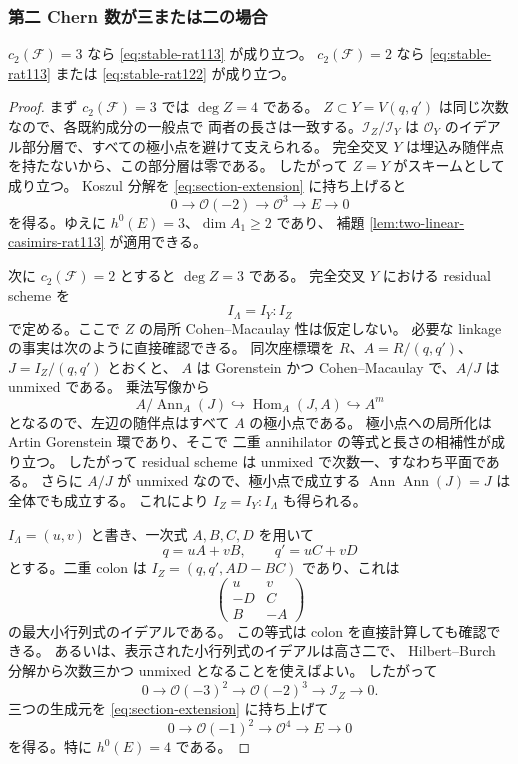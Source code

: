 \subsubsection{第二 Chern 数が三または二の場合}

\begin{proposition}
\label{prop:chern-two-three}
$c_2(\mathcal F)=3$ なら \eqref{eq:stable-rat113} が成り立つ。
$c_2(\mathcal F)=2$ なら \eqref{eq:stable-rat113} または
\eqref{eq:stable-rat122} が成り立つ。
\end{proposition}

\begin{proof}
まず $c_2(\mathcal F)=3$ では $\deg Z=4$ である。
$Z\subset Y=V(q,q')$ は同じ次数なので、各既約成分の一般点で
両者の長さは一致する。$\mathcal I_Z/\mathcal I_Y$ は
$\mathcal O_Y$ のイデアル部分層で、すべての極小点を避けて支えられる。
完全交叉 $Y$ は埋込み随伴点を持たないから、この部分層は零である。
したがって $Z=Y$ がスキームとして成り立つ。
Koszul 分解を \eqref{eq:section-extension} に持ち上げると
\[
 0\longrightarrow\mathcal O(-2)\longrightarrow\mathcal O^3
 \longrightarrow E\longrightarrow0
\]
を得る。ゆえに $h^0(E)=3$、$\dim A_1\geq2$ であり、
補題 \ref{lem:two-linear-casimirs-rat113} が適用できる。

次に $c_2(\mathcal F)=2$ とすると $\deg Z=3$ である。
完全交叉 $Y$ における residual scheme を
\[
 I_\Lambda=I_Y:I_Z
\]
で定める。ここで $Z$ の局所 Cohen--Macaulay 性は仮定しない。
必要な linkage の事実は次のように直接確認できる。
同次座標環を $R$、$A=R/(q,q')$、$J=I_Z/(q,q')$ とおくと、
$A$ は Gorenstein かつ Cohen--Macaulay で、$A/J$ は unmixed である。
乗法写像から
\[
 A/\operatorname{Ann}_A(J)
 \hookrightarrow\operatorname{Hom}_A(J,A)\hookrightarrow A^m
\]
となるので、左辺の随伴点はすべて $A$ の極小点である。
極小点への局所化は Artin Gorenstein 環であり、そこで
二重 annihilator の等式と長さの相補性が成り立つ。
したがって residual scheme は unmixed で次数一、すなわち平面である。
さらに $A/J$ が unmixed なので、極小点で成立する
$\operatorname{Ann}\operatorname{Ann}(J)=J$ は全体でも成立する。
これにより $I_Z=I_Y:I_\Lambda$ も得られる。

$I_\Lambda=(u,v)$ と書き、一次式 $A,B,C,D$ を用いて
\[
 q=uA+vB,\qquad q'=uC+vD
\]
とする。二重 colon は
$I_Z=(q,q',AD-BC)$ であり、これは
\[
 \begin{pmatrix}u&v\\-D&C\\B&-A\end{pmatrix}
\]
の最大小行列式のイデアルである。
この等式は colon を直接計算しても確認できる。
あるいは、表示された小行列式のイデアルは高さ二で、
Hilbert--Burch 分解から次数三かつ unmixed となることを使えばよい。
したがって
\[
 0\longrightarrow\mathcal O(-3)^2\longrightarrow\mathcal O(-2)^3
 \longrightarrow\mathcal I_Z\longrightarrow0.
\]
三つの生成元を \eqref{eq:section-extension} に持ち上げて
\begin{equation}
 0\longrightarrow\mathcal O(-1)^2\longrightarrow\mathcal O^4
 \longrightarrow E\longrightarrow0
 \label{eq:steiner-E}
\end{equation}
を得る。特に $h^0(E)=4$ である。


\end{proof}
